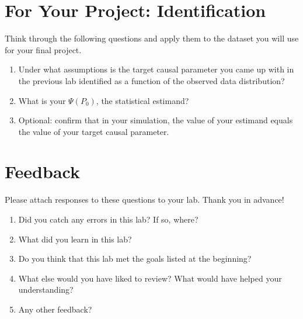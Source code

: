 \documentclass{exam}
\begin{document}
\pagebreak
\section{For Your Project: Identification}

Think through the following questions and apply them to the dataset you will use for your final project.

\begin{enumerate}
\item Under what assumptions is the target causal parameter you came up with in the previous lab identified as a function of the observed data distribution?
\item What is your $\Psi(P_0)$, the statistical estimand?
\item Optional: confirm that in your simulation, the value of your estimand equals the value of your target causal parameter.
\end{enumerate}

\pagebreak

\section{Feedback}

Please attach responses to these questions to your lab. Thank you in advance!

\begin{enumerate}
\item Did you catch any errors in this lab? If so, where?
\item What did you learn in this lab?
\item Do you think that this lab met the goals listed at the beginning? 
\item What else would you have liked to review? What would have helped your understanding?
\item Any other feedback?
\end{enumerate}
\end{document}
